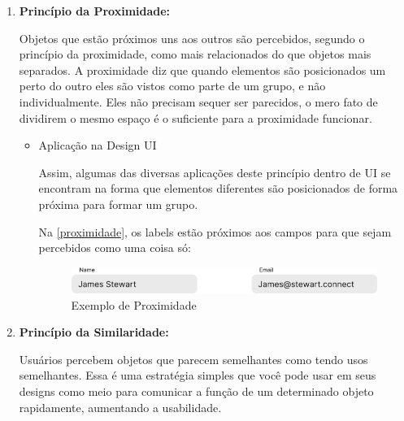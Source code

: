 \begin{enumerate}
    \item \textbf{Princípio da Proximidade:}
    
    Objetos que estão próximos uns aos outros são percebidos, segundo o princípio da proximidade, como mais relacionados do que objetos mais separados. A proximidade diz que quando elementos são posicionados um perto do outro eles são vistos como parte de um grupo, e não individualmente. Eles não precisam sequer ser parecidos, o mero fato de dividirem o mesmo espaço é o suficiente para a proximidade funcionar.
    
    \begin{itemize}
        \item Aplicação na Design \ac{UI}
        
        Assim, algumas das diversas aplicações deste princípio dentro de \ac{UI} se encontram na forma que elementos diferentes são posicionados de forma próxima para formar um grupo.
        
        Na \autoref{proximidade}, os labels estão próximos aos campos para que sejam percebidos como uma coisa só:
        
        \begin{figure}[htb]
        	\begin{center}
        	    \includegraphics[scale=0.45]{figs/proximidade.png}
        	\end{center}
        	\caption{\label{proximidade}Exemplo de Proximidade}
        \end{figure}
    \end{itemize}

    \item \textbf{Princípio da Similaridade:}
    
    Usuários percebem objetos que parecem semelhantes como tendo usos semelhantes. Essa é uma estratégia simples que você pode usar em seus designs como meio para comunicar a função de um determinado objeto rapidamente, aumentando a usabilidade.
    

\end{enumerate}
